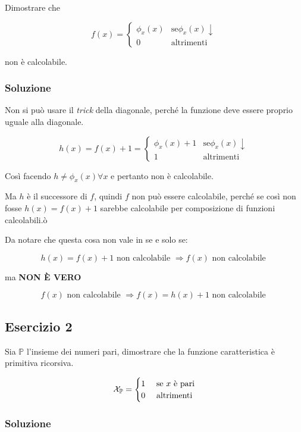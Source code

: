 Dimostrare che 

$$
f(x) = \begin{cases}
\phi_x(x) &\text{se} \phi_x(x)\downarrow \\
0 &\text{altrimenti}
\end{cases}
$$

non è calcolabile.

\subsubsection{Soluzione}

Non si può usare il \textit{trick} della diagonale, perché la funzione deve essere proprio uguale alla diagonale.

$$ h(x) = f(x)+1 = \begin{cases}
\phi_x(x)  + 1 &\text{se} \phi_x(x)\downarrow \\
1 &\text{altrimenti}
\end{cases}
 $$

Così facendo $ h \neq \phi_x(x) \forall x $ e pertanto non è calcolabile.

Ma $ h $ è il successore di $ f $, quindi $ f $ non può essere calcolabile, perché se così non fosse $ h(x) = f(x) +1 $ sarebbe calcolabile per composizione di funzioni calcolabili.ò

Da notare che questa cosa non vale in se e solo se:

$$ h(x) = f(x) +1 \text{ non calcolabile }\Rightarrow f(x)  \text{ non calcolabile } $$

ma \textbf{NON \`{E} VERO}

$$ f(x) \text{ non calcolabile } \Rightarrow f(x) = h(x) +1 \text{ non calcolabile }$$

\subsection{Esercizio 2}

Sia $ \mathbb{P} $ l'insieme dei numeri pari, dimostrare che la funzione caratteristica è primitiva ricorsiva.

$$
\mathcal{X}_\mathbb{P} = \begin{cases}
1 &\text{ se $ x $ è pari} \\
0 &\text{ altrimenti}
\end{cases}
$$

\subsubsection{Soluzione}

